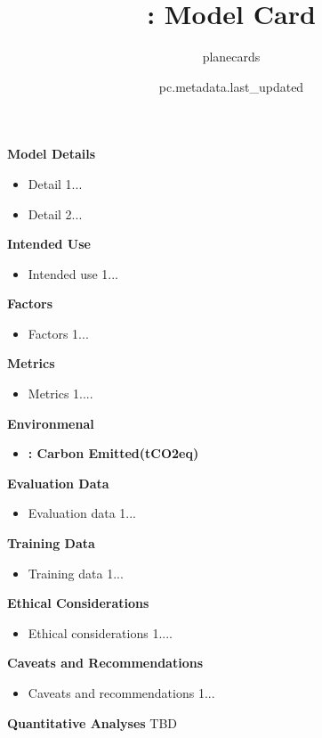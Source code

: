 \documentclass{article}
\title{\VAR{pc.metadata.name}: Model Card}
\author{planecards}
\date{pc.metadata.last_updated}
\begin{document}
\newenvironment{mcsection}[1]
    {
        \textbf{#1}


        \begin{itemize}[leftmargin=*,topsep=0pt,itemsep=-1ex,partopsep=1ex,parsep=1ex,after=\vspace{\medskipamount}]
    }
    {
        \end{itemize}
    }

\begin{adjustwidth}{-60pt}{-30pt}
\begin{singlespace}

\begin{tcolorbox}[title=\textbf{\VAR{pc.metadata.name} : Model Card},
    breakable, sharp corners, boxrule=0.7pt]

\begin{mcsection}{Model Details}
    \item Detail 1...
    \item Detail 2...
\end{mcsection}

\begin{mcsection}{Intended Use}
    \item Intended use 1...
\end{mcsection}

\begin{mcsection}{Factors}
    \item Factors 1...
\end{mcsection}

\begin{mcsection}{Metrics}
    \item Metrics 1....
\end{mcsection}

\begin{mcsection}{Environmenal}
    \item \textbf{ : Carbon Emitted(tCO2eq)}
\end{mcsection}

\begin{mcsection}{Evaluation Data}
    \item Evaluation data 1...
\end{mcsection}

\begin{mcsection}{Training Data}
    \item Training data 1...
\end{mcsection}

\begin{mcsection}{Ethical Considerations}
    \item Ethical considerations 1....
\end{mcsection}

\begin{mcsection}{Caveats and Recommendations}
    \item Caveats and recommendations 1...
\end{mcsection}

\textbf{Quantitative Analyses}
TBD
\end{tcolorbox}
\end{singlespace}
\end{adjustwidth}
\end{document}

